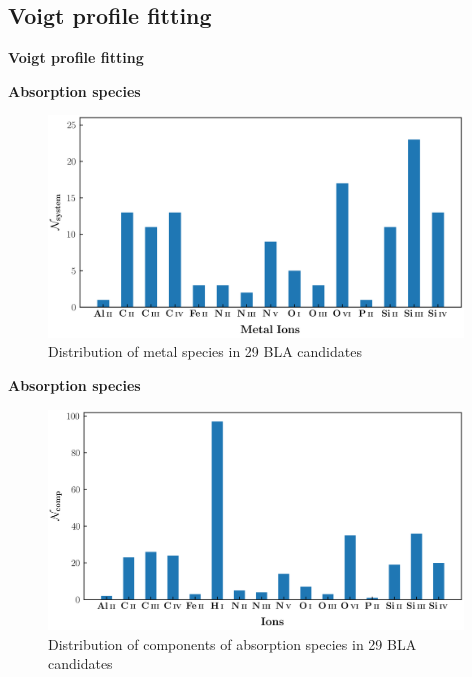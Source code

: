 \begin{frame}{}

\section{Voigt profile fitting}

\vspace*{1cm}

{\huge{\textbf{Voigt profile fitting}}}

\end{frame}



\begin{frame}{\textbf{Absorption species}}

\begin{figure}[!htbp]
  \centering
  \vspace{3mm}
  \includegraphics[width=11cm]{Figures-Thesis/metal-ion-system.png}
  \vspace*{-1mm}
  \caption{Distribution of metal species in 29 BLA candidates}
\end{figure}

\end{frame}


\begin{frame}[noframenumbering]{\textbf{Absorption species}}

  \begin{figure}[!htbp]
    \centering
    \vspace{3mm}
    \includegraphics[width=11cm]{Figures-Thesis/ion-component.png}
    \vspace*{-1mm}
    \caption{Distribution of components of absorption species in 29 BLA candidates}
  \end{figure}
  
  \end{frame}



